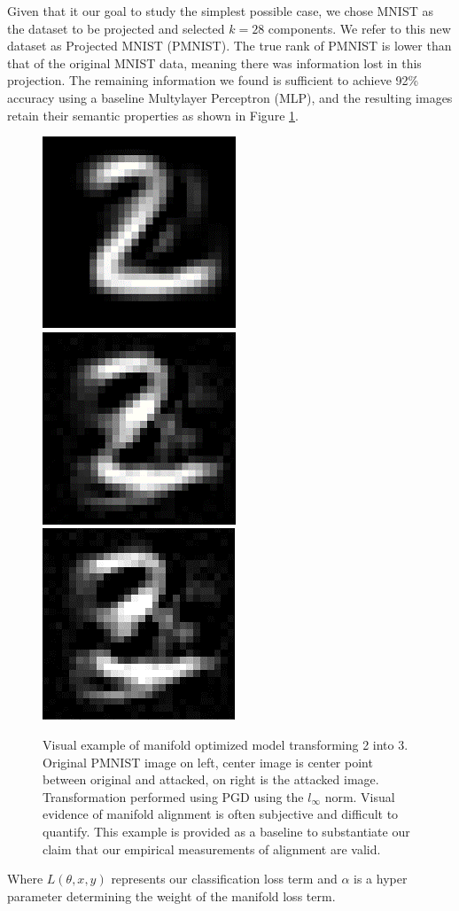 Given that it our goal to study the simplest possible case, we chose MNIST as the dataset to be projected and selected $k = 28$ components.
We refer to this new dataset as Projected MNIST (PMNIST).
The true rank of PMNIST is lower than that of the original MNIST data, meaning there was information lost in this projection.
The remaining information we found is sufficient to achieve 92\% accuracy using a baseline Multylayer Perceptron (MLP), and the resulting images retain their semantic properties as shown in Figure \ref{fig:perception}.

\begin{figure}
    \centering
    \includegraphics[width=0.25\linewidth]{c3_figures/pag_0.png}
    \includegraphics[width=0.25\linewidth]{c3_figures/pag_1.png}
    \includegraphics[width=0.25\linewidth]{c3_figures/pag_2.png}
    \caption{Visual example of manifold optimized model transforming 2 into 3. Original PMNIST image on left, center image is center point between original and attacked, on right is the attacked image. Transformation performed using PGD using the $l_\infty$ norm. Visual evidence of manifold alignment is often subjective and difficult to quantify. This example is provided as a baseline to substantiate our claim that our empirical measurements of alignment are valid.}
    \label{fig:perception}
\end{figure}



Where $L(\theta, x, y)$ represents our classification loss term and $\alpha$ is a hyper parameter determining the weight of the manifold loss term.



